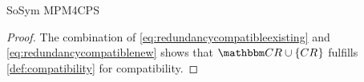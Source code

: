 \begin{copiedFrom}{SoSym MPM4CPS}
\begin{proof}
    The combination of \autoref{eq:redundancycompatibleexisting} and \autoref{eq:redundancycompatiblenew} shows that $\consistencyrelationset{CR} \cup \setted{\consistencyrelation{CR}{}}$ fulfills \autoref{def:compatibility} for compatibility.
\end{proof}


\end{copiedFrom}
